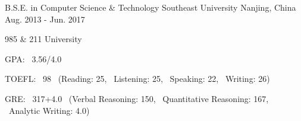 

\begin{cventries}

  \cventry
    {B.S.E. in Computer Science \& Technology} %
    {Southeast University} %
    {Nanjing, China} %
    {Aug. 2013 - Jun. 2017} %
    {
      \begin{cvitems} %
        \item {985 \& 211 University}
        \item {GPA: \ 3.56/4.0} 
        \item {TOEFL: \ 98 \  (Reading: 25, \ Listening: 25, \ Speaking: 22, \ Writing: 26)}
        \item {GRE: \ 317+4.0 \ (Verbal Reasoning: 150, \ Quantitative Reasoning: 167, \ Analytic Writing: 4.0)}
      \end{cvitems} 
    }
    
\end{cventries}